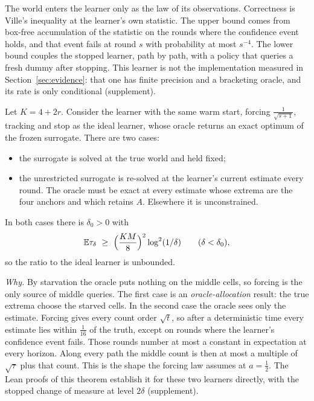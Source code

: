 
The world enters the learner only as the law of its observations. Correctness is Ville's
inequality at the learner's own statistic. The upper bound comes from box-free accumulation of
the statistic on the rounds where the confidence event holds, and that event fails at round
$s$ with probability at most $s^{-4}$. The lower bound couples the stopped learner, path by
path, with a policy that queries a fresh dummy after stopping. This learner is not the
implementation measured in Section~\ref{sec:evidence}: that one has finite precision and a
bracketing oracle, and its rate is only conditional (supplement).

\begin{theorem}
\label{thm:surlearner}
Let $K=4+2r$. Consider the learner with the same warm start, forcing $\frac{1}{\sqrt{s+1}}$,
tracking and stop as the ideal learner, whose oracle returns an exact optimum of the frozen
surrogate. There are two cases:
\begin{itemize}
\item the surrogate is solved at the true world and held fixed;
\item the unrestricted surrogate is re-solved at the learner's current estimate every round.
The oracle must be exact at every estimate whose extrema are the four anchors and which
retains $A$. Elsewhere it is unconstrained.
\end{itemize}
In both cases there is $\delta_{0}>0$ with
\[
\mathbb{E}\tau_{\delta}\ \ge\ \Bigl(\frac{KM}{8}\Bigr)^{2}\log^{2}(1/\delta)
\qquad(\delta<\delta_{0}),
\]
so the ratio to the ideal learner is unbounded.
\end{theorem}


\emph{Why.} By starvation the oracle puts nothing on the middle cells, so forcing is the only
source of middle queries. The first case is an \emph{oracle-allocation} result: the true
extrema choose the starved cells. In the second case the oracle sees only the estimate. Forcing
gives every count order $\sqrt t$, so after a deterministic time every estimate lies within
$\frac1{16}$ of the truth, except on rounds where the learner's confidence event fails. Those
rounds number at most a constant in expectation at every horizon. Along every path the middle
count is then at most a multiple of $\sqrt{\tau}$ plus that count. This is the shape the
forcing law assumes at $a=\frac12$. The Lean proofs of this theorem establish it for these two
learners directly, with the stopped change of measure at level $2\delta$ (supplement).

